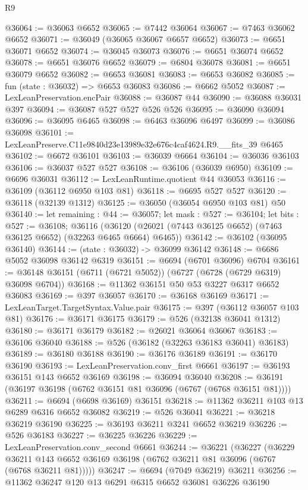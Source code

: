 \begin{lexlean}{R9}
\begin{coremodule}
@36064 := @36063 @6652
@36065 := @7442 @36064
@36067 := @7463 @36062 @6652
@36071 := @36049 (@36065 @36067 @6657 @6652)
@36073 := @6651 @36071 @6652
@36074 := @36045 @36073
@36076 := @6651 @36074 @6652
@36078 := @6651 @36076 @6652
@36079 := @6804 @36078
@36081 := @6651 @36079 @6652
@36082 := @6653 @36081
@36083 := @6653 @36082
@36085 := fun (state : @36032) => @6653 @36083
@36086 := @6662 @5052
@36087 := LexLeanPreservation.encPair
@36088 := @36087 @44
@36090 := @36088 @36031 @397
@36094 := @36087 @527 @527 @526 @526
@36095 := @36090 @36094
@36096 := @36095 @6465
@36098 := @6463 @36096 @6497
@36099 := @36086 @36098
@36101 := LexLeanPreserve.C11e9840d23e13989e32e676c4caf4624.R9.__fits_39 @6465
@36102 := @6672 @36101
@36103 := @36039 @6664
@36104 := @36036 @36103
@36106 := @36037 @527 @527
@36108 := @36106 (@36039 @6950)
@36109 := @6696 @36031
@36112 := LexLeanRuntime.quotient @44 @36053
@36116 := @36109 (@36112 @6950 @103 @81)
@36118 := @6695 @527 @527
@36120 := @36118 (@32139 @1312)
@36125 := @36050 (@36054 @6950 @103 @81) @50
@36140 := let remaining : @44 := @36057;
  let mask : @527 := @36104;
  let bits : @527 := @36108;
  @36116 (@36120 (@26021 (@7443 @36125 @6652) (@7463 @36125 @6652) (@32263 @6465 @6664) @6465))
@36142 := @36102 (@36095 @36140)
@36144 := (state : @36032) -> @36099 @36142
@36148 := @6686 @5052 @36098 @36142 @6319
@36151 := @6694 (@6701 @36096) @6704
@36161 := @36148 @36151 (@6711 (@6721 @5052)) (@6727 (@6728 (@6729 @6319) @36098 @6704))
@36168 := @11362 @36151 @50 @53 @3227 @6317 @6652 @36083
@36169 := @397 @36057
@36170 := @36168 @36169
@36171 := LexLeanTarget.TargetSyntax.Value.pair
@36175 := @397 (@36112 @36057 @103 @81)
@36176 := @36171 @36175
@36179 := @526 (@32138 @36041 @1312)
@36180 := @36171 @36179
@36182 := @26021 @36064 @36067
@36183 := @36106 @36040
@36188 := @526 (@36182 (@32263 @36183 @36041) @36183)
@36189 := @36180 @36188
@36190 := @36176 @36189
@36191 := @36170 @36190
@36193 := LexLeanPreservation.conv_first @6661
@36197 := @36193 @36151 @143 @6652 @36169
@36198 := @36094 @36040
@36208 := @36191 (@36197 @36198 (@6762 @36151 @81 @36096 (@6767 (@6768 @36151 @81))))
@36211 := @6694 (@6698 @36169) @36151
@36218 := @11362 @36211 @103 @13 @6289 @6316 @6652 @36082
@36219 := @526 @36041
@36221 := @36218 @36219 @36190
@36225 := @36193 @36211 @3241 @6652 @36219
@36226 := @526 @36183
@36227 := @36225 @36226
@36229 := LexLeanPreservation.conv_second @6661
@36244 := @36221
    (@36227
      (@36229 @36211 @143 @6652 @36169 @36198 (@6762 @36211 @81 @36096 (@6767 (@6768 @36211 @81)))))
@36247 := @6694 (@7049 @36219) @36211
@36256 := @11362 @36247 @120 @13 @6291 @6315 @6652 @36081 @36226 @36190

\end{coremodule}
\end{lexlean}
